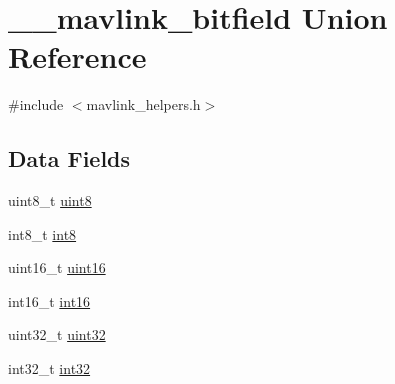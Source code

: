 \hypertarget{union____mavlink__bitfield}{\section{\+\_\+\+\_\+mavlink\+\_\+bitfield Union Reference}
\label{union____mavlink__bitfield}
}


{\ttfamily \#include $<$mavlink\+\_\+helpers.\+h$>$}

\subsection*{Data Fields}
\begin{DoxyCompactItemize}
\item 
uint8\+\_\+t \hyperlink{union____mavlink__bitfield_ade669a5f63c53f0d61f636eff94417c0}{uint8}
\item 
int8\+\_\+t \hyperlink{union____mavlink__bitfield_a50a846d427d7a1d7dc79235c87597622}{int8}
\item 
uint16\+\_\+t \hyperlink{union____mavlink__bitfield_a0ca76ce4a09ee26387e50b6702c17894}{uint16}
\item 
int16\+\_\+t \hyperlink{union____mavlink__bitfield_a99cd7f966d8a59b29d05197b39c5b229}{int16}
\item 
uint32\+\_\+t \hyperlink{union____mavlink__bitfield_ab43ed56310c2d778ebaa7a5a21cb6587}{uint32}
\item 
int32\+\_\+t \hyperlink{union____mavlink__bitfield_a07bd702e8b91679a25e632ad90d0a1ec}{int32}
\end{DoxyCompactItemize}


